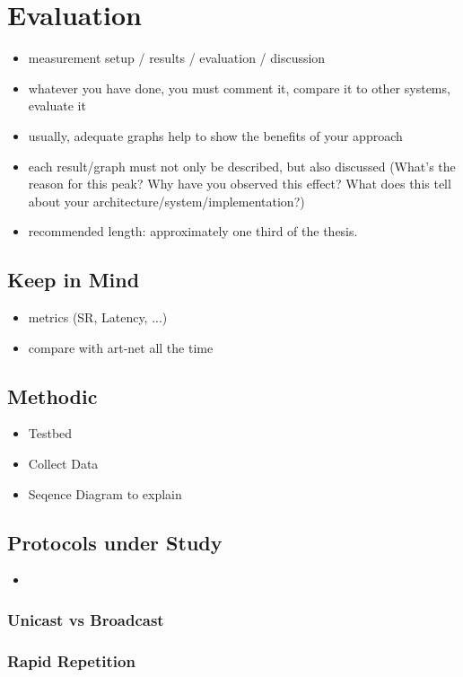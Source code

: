 \documentclass[]{ccs-thesis}
\begin{document}
\chapter{Evaluation}
\begin{itemize}
\item measurement setup / results / evaluation / discussion
\item whatever you have done, you must comment it, compare it to other systems, evaluate it
\item usually, adequate graphs help to show the benefits of your approach
\item each result/graph must not only be described, but also discussed (What's the reason for this peak? Why have you observed this effect? What does this tell about your architecture/system/implementation?)
\item recommended length: approximately one third of the thesis.
\end{itemize}

\section*{Keep in Mind}
\begin{itemize}
\item metrics (SR, Latency, ...)
\item compare with art-net all the time
\end{itemize}

\section{Methodic}
\begin{itemize}
	\item Testbed
	\item Collect Data
	\item Seqence Diagram to explain 
\end{itemize}

\section{Protocols under Study}
\begin{itemize}
	\item 
\end{itemize}
\subsection*{Unicast vs Broadcast}
\subsection*{Rapid Repetition}
\end{document}
